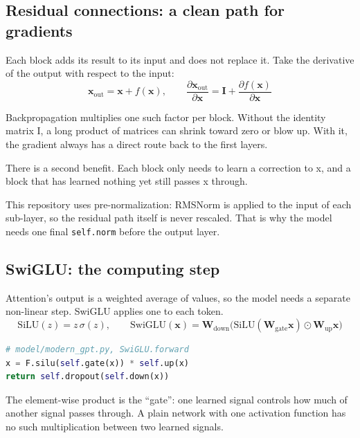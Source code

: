 \documentclass[11pt,a4paper]{article}
\newcommand{\code}[1]{\texttt{#1}}
\begin{document}
\subsection*{Residual connections: a clean path for gradients}
{}

Each block adds its result to its input and does not replace it. Take the derivative of the output with respect to the input:
\[
\mathbf{x}_{\text{out}} = \mathbf{x} + f(\mathbf{x}),\qquad
\frac{\partial \mathbf{x}_{\text{out}}}{\partial \mathbf{x}} = \mathbf{I} + \frac{\partial f(\mathbf{x})}{\partial \mathbf{x}}
\]

Backpropagation multiplies one such factor per block. Without the identity matrix I, a long product of matrices can shrink toward zero or blow up. With it, the gradient always has a direct route back to the first layers.

There is a second benefit. Each block only needs to learn a correction to x, and a block that has learned nothing yet still passes x through.

This repository uses pre-normalization: RMSNorm is applied to the input of each sub-layer, so the residual path itself is never rescaled. That is why the model needs one final \code{self.\allowbreak{}norm} before the output layer.

\subsection*{SwiGLU: the computing step}
{}

Attention's output is a weighted average of values, so the model needs a separate non-linear step. SwiGLU applies one to each token.
\[
\mathrm{SiLU}(z)=z\,\sigma(z),\qquad
\mathrm{SwiGLU}(\mathbf{x})=\mathbf{W}_{\text{down}}\big(\mathrm{SiLU}(\mathbf{W}_{\text{gate}}\mathbf{x})\odot\mathbf{W}_{\text{up}}\mathbf{x}\big)
\]

\begin{lstlisting}[language=Python]
# model/modern_gpt.py, SwiGLU.forward
x = F.silu(self.gate(x)) * self.up(x)
return self.dropout(self.down(x))
\end{lstlisting}

The element-wise product is the “gate”: one learned signal controls how much of another signal passes through. A plain network with one activation function has no such multiplication between two learned signals.
\end{document}
